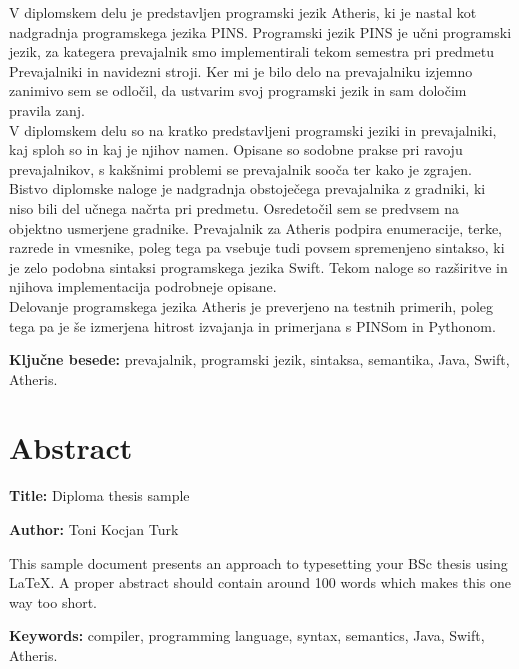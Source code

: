 \documentclass[a4paper, 12p]{book}
\newcommand{\ttitleEn}{Diploma thesis sample}
\newcommand{\tauthor}{Toni Kocjan Turk}
\newcommand{\tkeywords}{prevajalnik, programski jezik, sintaksa, semantika, Java, Swift, Atheris}
\newcommand{\tkeywordsEn}{compiler, programming language, syntax, semantics, Java, Swift, Atheris}
\newcommand{\clearemptydoublepage}{\newpage{\pagestyle{empty}\cleardoublepage}}
\begin{document}
V diplomskem delu je predstavljen programski jezik Atheris, ki je nastal kot nadgradnja programskega jezika PINS. Programski jezik PINS je učni programski jezik, za kategera prevajalnik smo implementirali tekom semestra pri predmetu Prevajalniki in navidezni stroji. Ker mi je bilo delo na prevajalniku izjemno zanimivo sem se odločil, da ustvarim svoj programski jezik in sam določim pravila zanj. \\
\indent V diplomskem delu so na kratko predstavljeni programski jeziki in prevajalniki, kaj sploh so in kaj je njihov namen. Opisane so sodobne prakse pri ravoju prevajalnikov, s kakšnimi problemi se prevajalnik sooča ter kako je zgrajen. \\
\indent Bistvo diplomske naloge je nadgradnja obstoječega prevajalnika z gradniki, ki niso bili del učnega načrta pri predmetu. Osredetočil sem se predvsem na objektno usmerjene gradnike. Prevajalnik za Atheris podpira enumeracije, terke, razrede in vmesnike, poleg tega pa vsebuje tudi povsem spremenjeno sintakso, ki je zelo podobna sintaksi programskega jezika Swift. Tekom naloge so razširitve in njihova implementacija podrobneje opisane. \\
\indent Delovanje programskega jezika Atheris je preverjeno na testnih primerih, poleg tega pa je še izmerjena hitrost izvajanja in primerjana s PINSom in Pythonom.

\noindent 

\bigskip

\noindent\textbf{Ključne besede:} \tkeywords.
\clearemptydoublepage

\chapter*{Abstract}

\noindent\textbf{Title:} \ttitleEn
\bigskip

\noindent\textbf{Author:} \tauthor
\bigskip

\noindent This sample document presents an approach to typesetting your BSc thesis using \LaTeX. 
A proper abstract should contain around 100 words which makes this one way too short.
\bigskip

\noindent\textbf{Keywords:} \tkeywordsEn.
\clearemptydoublepage

\mainmatter
\setcounter{page}{1}
\pagestyle{fancy}
\end{document}
